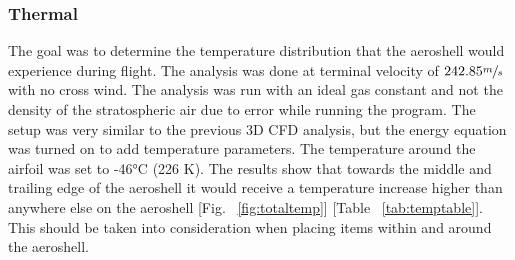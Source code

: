 \subsubsection*{Thermal}
\indent\indent The goal was to determine the temperature distribution that the aeroshell would experience during flight. The analysis was done at terminal velocity of $242.85 \sfrac{m}{s}$ with no cross wind. The analysis was run with an ideal gas constant and not the density of the stratospheric air due to error while running the program. The setup was very similar to the previous 3D CFD analysis, but the energy equation was turned on to add temperature parameters. The temperature around the airfoil was set to -46°C (226 K). The results show that towards the middle and trailing edge of the aeroshell it would receive a temperature increase higher than anywhere else on the aeroshell [Fig. ~\ref{fig:totaltemp}] [Table ~\ref{tab:temptable}]. This should be taken into consideration when placing items within and around the aeroshell.

